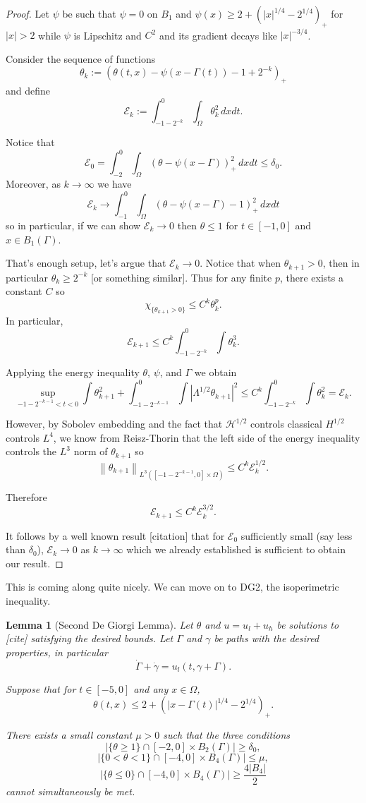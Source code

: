 \documentclass[11pt]{amsart}
\newtheorem{lemma}[theorem]{Lemma}
\theoremstyle{remark}
\theoremstyle{definition}
\newcommand{\E}{\mathcal{E}}
\newcommand{\norm}[1]{\left\lVert#1\right\rVert}
\newcommand{\paren}[1]{\left( #1 \right)}
\newcommand{\abs}[1]{\left\lvert #1 \right\rvert}
\newcommand{\indic}[1]{\chi_{\{#1\}}}
\newcommand{\ulow}{u_l}
\newcommand{\uhigh}{u_h}
\newcommand{\HD}{\mathcal{H}}
\begin{document}
\begin{proof}
Let $\psi$ be such that $\psi = 0$ on $B_1$ and $\psi(x) \geq 2 + \paren{|x|^{1/4}-2^{1/4}}_+$ for $|x|>2$ while $\psi$ is Lipschitz and $C^2$ and its gradient decays like $|x|^{-3/4}$.  

Consider the sequence of functions
\[ \theta_k := (\theta(t,x) - \psi(x - \Gamma(t)) - 1 + 2^{-k})_+ \]
and define
\[ \E_k := \int_{-1-2^{-k}}^0 \int_\Omega \theta_k^2 \,dxdt. \]

Notice that
\[ \E_0 = \int_{-2}^0 \int_\Omega (\theta - \psi(x-\Gamma))_+^2 \,dxdt \leq \delta_0. \]
Moreover, as $k \to \infty$ we have
\[ \E_k \to \int_{-1}^0 \int_\Omega (\theta - \psi(x-\Gamma) - 1)_+^2 \,dxdt \]
so in particular, if we can show $\E_k \to 0$ then $\theta \leq 1$ for $t \in [-1,0]$ and $x \in B_1(\Gamma)$.  

That's enough setup, let's argue that $\E_k \to 0$.  Notice that when $\theta_{k+1}>0$, then in particular $\theta_k \geq 2^{-k}$ [or something similar].  Thus for any finite $p$, there exists a constant $C$ so
\[ \indic{\theta_{k+1}>0} \leq C^k \theta_k^p. \]
In particular,
\[ \E_{k+1} \leq C^k \int_{-1-2^{-k}}^0 \int \theta_k^3. \]

Applying the energy inequality $\theta$, $\psi$, and $\Gamma$ we obtain
\[ \sup_{-1-2^{-k-1}<t<0} \int \theta_{k+1}^2 + \int_{-1-2^{-k-1}}^0 \int \abs{\Lambda^{1/2}\theta_{k+1}}^2 \leq C^k \int_{-1-2^{-k}}^0 \int \theta_k^2 = \E_k. \]

However, by Sobolev embedding and the fact that $\HD^{1/2}$ controls classical $H^{1/2}$ controls $L^4$, we know from Reisz-Thorin that the left side of the energy inequality controls the $L^3$ norm of $\theta_{k+1}$ so
\[ \norm{\theta_{k+1}}_{L^3([-1-2^{-k-1},0]\times\Omega)} \leq C^k \E_k^{1/2}. \]

Therefore
\[ \E_{k+1} \leq C^k \E_k^{3/2}. \]

It follows by a well known result [citation] that for $\E_0$ sufficiently small (say less than $\delta_0$), $\E_k \to 0$ as $k \to \infty$ which we already established is sufficient to obtain our result.  
\end{proof}


This is coming along quite nicely.  We can move on to DG2, the isoperimetric inequality.  

\begin{lemma}[Second De Giorgi Lemma] \label{thm:DG2}
Let $\theta$ and $u = \ulow + \uhigh$ be solutions to [cite] satisfying the desired bounds.  Let $\Gamma$ and $\gamma$ be paths with the desired properties, in particular
\[ \dot{\Gamma} +\dot{\gamma} = \ulow(t,\gamma + \Gamma). \]

Suppose that for $t \in [-5,0]$ and any $x \in \Omega$,
\[ \theta(t,x) \leq 2 + \paren{|x-\Gamma(t)|^{1/4}-2^{1/4}}_+. \]

There exists a small constant $\mu > 0$ such that the three conditions
\[ \abs{\{\theta \geq 1\} \cap [-2,0]\times B_2(\Gamma)} \geq \delta_0, \]
\[ \abs{\{0 < \theta < 1\} \cap [-4,0]\times B_4(\Gamma)} \leq \mu, \]
\[ \abs{\{\theta \leq 0\} \cap [-4,0]\times B_4(\Gamma)} \geq \frac{4 |B_4|}{2} \]
cannot simultaneously be met.  
\end{lemma}
\end{document}
